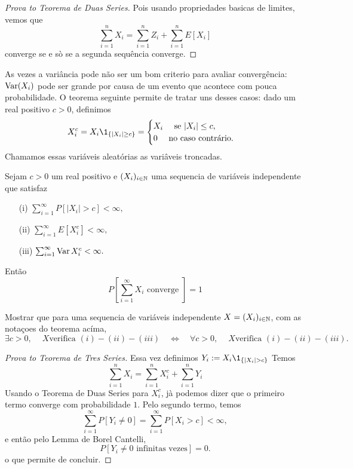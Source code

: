 \begin{topics}
\begin{proof}[Prova to Teorema de Duas Series]
  Pois usando propriedades basicas de limites, vemos que $$\sum_{i=1}^n X_i=\sum_{i=1}^n Z_i+ \sum_{i=1}^n E[X_i]$$ converge se e sò se a segunda sequência converge.
\end{proof}

As vezes a variância pode não ser um bom criterio para avaliar convergência: $\operatorname{Var}(X_i)$ pode ser grande por causa de um evento que
acontece com pouca probabilidade. O teorema seguinte permite de tratar uns desses casos:
dado um real positivo $c>0$, definimos
\begin{equation}
X_i^c= X_i \1_{\{|X_i| \ge c\}}= \begin{cases} X_i \quad \text{ se } |X_i|\le c,\\
                                    0 \quad \text{ no caso contrário.}
                                   \end{cases}
           \end{equation}
Chamamos essas variáveis aleatórias as variâveis troncadas.

\begin{theorem}
 Sejam $c>0$ um real positivo e $(X_i)_{i\in {\ensuremath{\mathbb N}}}$ uma sequencia de variáveis independente que
satisfaz
\begin{itemize}
 \item [(i)]  $\sum_{i=1}^\infty P[ |X_i|>c ]<\infty,$
 \item [(ii)]  $\sum_{i=1}^\infty E[ X^c_i]<\infty,$
 \item [(iii)]  $\sum_{i=1}^\infty \operatorname{Var} X^c_i<\infty.$
\end{itemize}
Então
$$ P[\sum_{i=1}^{\infty} X_i \text{ converge } ]= 1 $$
\end{theorem}

\begin{exercise}
  Mostrar que para uma sequencia de variáveis independente $X=(X_i)_{i\in {\ensuremath{\mathbb N}}}$, com as notaçoes do teorema acíma,
  \begin{equation}
    \exists c>0,\ \quad X \text{verifica $(i)-(ii)-(iii)$}
    \quad \Leftrightarrow \quad \forall c>0,\ \quad X \text{verifica $(i)-(ii)-(iii)$}.
  \end{equation}
\end{exercise}

\begin{proof}[Prova to Teorema de Tres Series]
Essa vez definimos $Y_i:= X_i \1_{\{|X_i| > c\}}$
Temos
\begin{equation}
 \sum_{i=1}^n X_i =  \sum_{i=1}^n X_i^c + \sum_{i=1}^n Y_i
\end{equation}
Usando o Teorema de Duas Series para $X_i^c$, jà podemos dizer que o primeiro termo converge com probabilidade $1$.
Pelo segundo termo, temos
\begin{equation}
 \sum_{i=1}^{\infty} P[Y_i\ne 0]=   \sum_{i=1}^{\infty} P[ X_i>c ]< \infty,
\end{equation}
e então pelo Lemma de Borel Cantelli, $$P[ Y_i \ne 0 \text{ infinitas vezes}]=0.$$
 o que permite de concluir.
\end{proof}



\end{topics}
